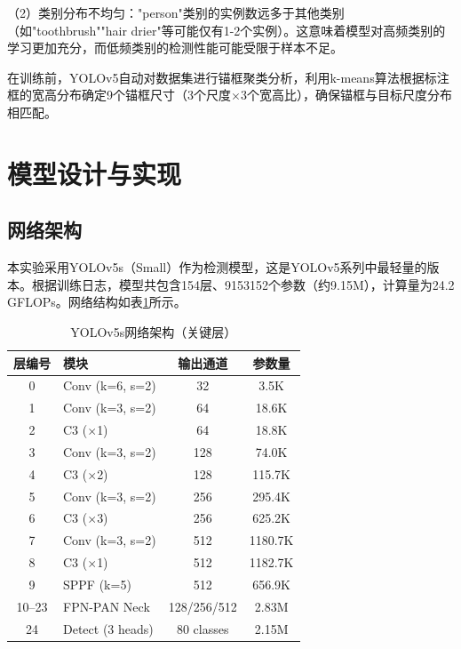 \documentclass[12pt,a4paper]{article}
\begin{document}
（2）类别分布不均匀："person"类别的实例数远多于其他类别（如"toothbrush""hair drier"等可能仅有1-2个实例）。这意味着模型对高频类别的学习更加充分，而低频类别的检测性能可能受限于样本不足。

在训练前，YOLOv5自动对数据集进行锚框聚类分析，利用k-means算法根据标注框的宽高分布确定9个锚框尺寸（3个尺度$\times$3个宽高比），确保锚框与目标尺度分布相匹配。

\section{模型设计与实现}

\subsection{网络架构}

本实验采用YOLOv5s（Small）作为检测模型，这是YOLOv5系列中最轻量的版本。根据训练日志，模型共包含154层、9153152个参数（约9.15M），计算量为24.2 GFLOPs。网络结构如表\ref{tab:arch}所示。

\begin{table}[H]
\centering
\caption{YOLOv5s网络架构（关键层）}
\label{tab:arch}
\begin{tabular}{clcc}
\toprule
\textbf{层编号} & \textbf{模块} & \textbf{输出通道} & \textbf{参数量} \\
\midrule
0 & Conv (k=6, s=2) & 32 & 3.5K \\
1 & Conv (k=3, s=2) & 64 & 18.6K \\
2 & C3 ($\times$1) & 64 & 18.8K \\
3 & Conv (k=3, s=2) & 128 & 74.0K \\
4 & C3 ($\times$2) & 128 & 115.7K \\
5 & Conv (k=3, s=2) & 256 & 295.4K \\
6 & C3 ($\times$3) & 256 & 625.2K \\
7 & Conv (k=3, s=2) & 512 & 1180.7K \\
8 & C3 ($\times$1) & 512 & 1182.7K \\
9 & SPPF (k=5) & 512 & 656.9K \\
\midrule
10--23 & FPN-PAN Neck & 128/256/512 & 2.83M \\
24 & Detect (3 heads) & 80 classes & 2.15M \\
\bottomrule
\end{tabular}
\end{table}
\end{document}

